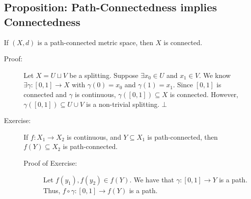 \documentclass[9pt]{extarticle}
\begin{document}
  \subsection{Proposition: Path-Connectedness implies Connectedness}%
  If $(X,d)$ is a path-connected metric space, then $X$ is connected.
  \begin{description}
    \item[Proof:] Let $X = U\sqcup V$ be a splitting. Suppose $\exists x_0\in U$ and $x_1\in V$. We know $\exists \gamma: [0,1]\rightarrow X$ with $\gamma(0) = x_0$ and $\gamma(1) = x_1$. Since $[0,1]$ is connected and $\gamma$ is continuous, $\gamma([0,1])\subseteq X$ is connected. However, $\gamma([0,1])\subseteq U\cup V$ is a non-trivial splitting. $\bot$
    \item[Exercise:] If $f: X_1\rightarrow X_2$ is continuous, and $Y\subseteq X_1$ is path-connected, then $f(Y)\subseteq X_2$ is path-connected.
      \begin{description}
        \item[Proof of Exercise:] Let $f(y_1),f(y_2)\in f(Y)$. We have that $\gamma: [0,1]\rightarrow Y$ is a path. Thus, $f\circ \gamma: [0,1]\rightarrow f(Y)$ is a path.
      \end{description}
  \end{description}
\end{document}
